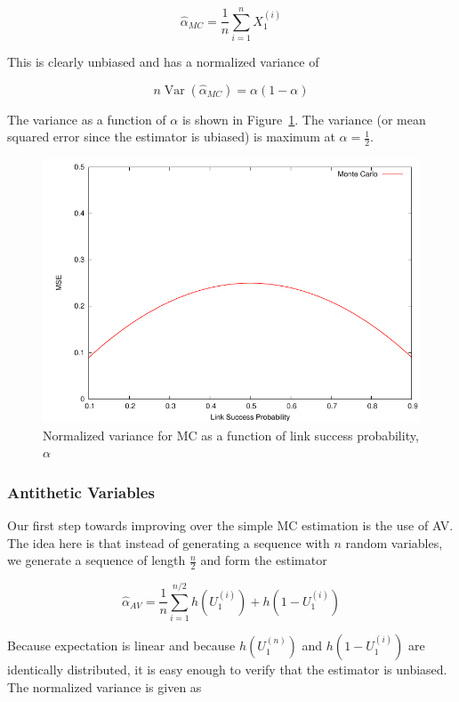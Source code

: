\documentclass[10pt]{article}
\DeclareMathOperator{\var}{Var}
\begin{document}
\begin{equation}
\hat{\alpha}_{MC} = \frac{1}{n}\displaystyle\sum_{i=1}^{n}X_{1}^{(i)}
\end{equation}

This is clearly unbiased and has a normalized variance of

\begin{equation}
n\var\left(\hat{\alpha}_{MC}\right) = \alpha(1-\alpha)
\end{equation}

The variance as a function of $\alpha$ is shown in Figure~\ref{fig:mc}. The variance (or mean squared error since the estimator is ubiased) is maximum at $\alpha = \frac{1}{2}$.
\begin{figure}[ht!]
\centering
\includegraphics[width=0.5\columnwidth]{img/monte_carlo}
\caption[Normalized variance for \acs{MC} as a function of link success probability, $\alpha$]{Normalized variance for \acf{MC} as a function of link success probability, $\alpha$}\label{fig:mc}
\end{figure}

\subsubsection{Antithetic Variables}
Our first step towards improving over the simple \ac{MC} estimation is the use of \ac{AV}\cite{ross-2006}. The idea here is that instead of generating a sequence with $n$ random variables, we generate a sequence of length $\frac{n}{2}$ and form the estimator

\begin{equation}
\hat{\alpha}_{AV} = \frac{1}{n}\displaystyle\sum_{i=1}^{n/2}h(U_{1}^{(i)})+h(1 - U_{1}^{(i)})\label{eq:av}
\end{equation}

Because expectation is linear and because $h(U_{1}^{(n)})$ and $h(1-U_{1}^{(i)})$ are identically distributed, it is easy enough to verify that the estimator is unbiased. The normalized variance is given as
\end{document}
